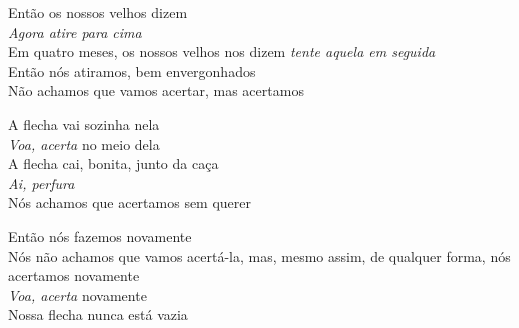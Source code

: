 \begin{linenumbers}\begingroup\raggedright
 
\noindent  Então os nossos velhos dizem\\
 \emph{Agora atire para cima}\\
 Em quatro meses, os nossos velhos nos dizem \emph{tente aquela em seguida}\\
 Então nós atiramos, bem envergonhados\\
 Não achamos que vamos acertar, mas acertamos
 
\end{linenumbers}\endgroup

\bigskip

\begin{linenumbers}\begingroup\raggedright
 
\noindent  A flecha vai sozinha nela\\
 \emph{Voa, acerta} no meio dela\\
 A flecha cai, bonita, junto da caça\\
 \emph{Ai, perfura}\\
 Nós achamos que acertamos sem querer
 
\end{linenumbers}\endgroup

\bigskip

\begin{linenumbers}\begingroup\raggedright
 
\noindent  Então nós fazemos novamente\\
 Nós não achamos que vamos acertá-la, mas, mesmo assim, de qualquer forma, nós acertamos novamente\\
 \emph{Voa, acerta} novamente\\
 Nossa flecha nunca está vazia
 
\end{linenumbers}\endgroup

